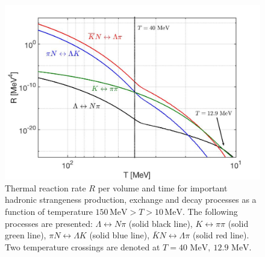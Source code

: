 \documentclass[universe,article,submit,moreauthors,pdftex,a4paper]{Definitions/mdpi}
\newcommand{\MeV}{\text{ MeV}}
\begin{document}
\begin{figure}[ht]
\begin{center}
\centering
\includegraphics[width=\linewidth]{./plots/NewHyperonRate_CTYang.jpg}
\caption{Thermal reaction rate $R$ per volume and time for important hadronic strangeness production, exchange and decay processes as a function of temperature $150\,\mathrm{MeV}> T>10\,\mathrm{MeV}$. The following processes are presented: $\Lambda\leftrightarrow N\pi$ (solid black line), $K\leftrightarrow\pi\pi$ (solid green line), $\pi N\leftrightarrow\Lambda K$ (solid blue line), $\bar K N\leftrightarrow\Lambda\pi$ (solid red line). Two temperature crossings are denoted at $T=40\MeV,\ 12.9\MeV$.}
\label{Lambda_Rate_volume.fig}
\end{center}
\end{figure}
\end{document}

